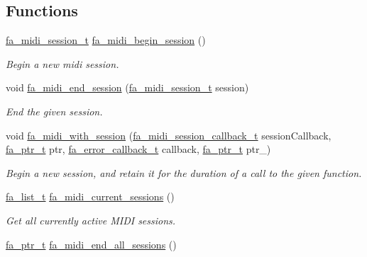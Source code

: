 \subsection*{Functions}
\begin{DoxyCompactItemize}
\item 
\hyperlink{group___fa_midi_ga222964548b932c6f53b575b23629530e}{fa\-\_\-midi\-\_\-session\-\_\-t} \hyperlink{group___fa_midi_ga2f1b526042c4356ce7e2adcf0d11ecad}{fa\-\_\-midi\-\_\-begin\-\_\-session} ()
\begin{DoxyCompactList}\small\item\em Begin a new midi session. \end{DoxyCompactList}\item 
void \hyperlink{group___fa_midi_gaa17624fa01a142329eef651bf58867ec}{fa\-\_\-midi\-\_\-end\-\_\-session} (\hyperlink{group___fa_midi_ga222964548b932c6f53b575b23629530e}{fa\-\_\-midi\-\_\-session\-\_\-t} session)
\begin{DoxyCompactList}\small\item\em End the given session. \end{DoxyCompactList}\item 
void \hyperlink{group___fa_midi_gaae4f24a325199a994a64d9d13023164d}{fa\-\_\-midi\-\_\-with\-\_\-session} (\hyperlink{group___fa_midi_ga20fb39192d8af433b1506a529bc981e7}{fa\-\_\-midi\-\_\-session\-\_\-callback\-\_\-t} session\-Callback, \hyperlink{group___fa_ga915ddeae99ad7568b273d2b876425197}{fa\-\_\-ptr\-\_\-t} ptr, \hyperlink{group___fa_error_ga43d8d45a005130a5052ba3281a8bf33e}{fa\-\_\-error\-\_\-callback\-\_\-t} callback, \hyperlink{group___fa_ga915ddeae99ad7568b273d2b876425197}{fa\-\_\-ptr\-\_\-t} ptr\-\_\-)
\begin{DoxyCompactList}\small\item\em Begin a new session, and retain it for the duration of a call to the given function. \end{DoxyCompactList}\item 
\hyperlink{group___fa_list_ga35ecb12ab934ded0cce0bcf28e3bc5d2}{fa\-\_\-list\-\_\-t} \hyperlink{group___fa_midi_gaf7d4af506bd8ec5194a2952346b968d7}{fa\-\_\-midi\-\_\-current\-\_\-sessions} ()
\begin{DoxyCompactList}\small\item\em Get all currently active M\-I\-D\-I sessions. \end{DoxyCompactList}\item 
\hyperlink{group___fa_ga915ddeae99ad7568b273d2b876425197}{fa\-\_\-ptr\-\_\-t} \hyperlink{group___fa_midi_ga7bd603a4286ddff81c1fd7c7656b4255}{fa\-\_\-midi\-\_\-end\-\_\-all\-\_\-sessions} ()

\end{DoxyCompactItemize}
